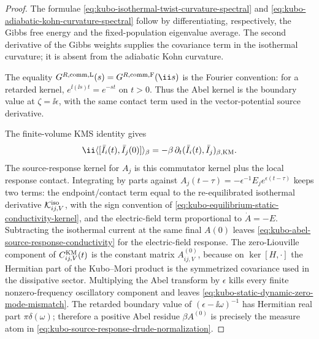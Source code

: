 \begin{proof}
The formulae
\eqref{eq:kubo-isothermal-twist-curvature-spectral} and
\eqref{eq:kubo-adiabatic-kohn-curvature-spectral} follow by differentiating,
respectively, the Gibbs free energy and the fixed-population eigenvalue
average.  The second derivative of the Gibbs weights supplies the covariance
term in the isothermal curvature; it is absent from the adiabatic Kohn
curvature.

The equality
\(G^{R,\rm comm,L}(s)=G^{R,\rm comm,F}(\ii s)\) is the Fourier convention:
for a retarded kernel,
\(e^{\ii(\ii s)t}=e^{-st}\) on \(t>0\).  Thus the Abel kernel is the boundary
value at \(\zeta=\ii\epsilon\), with the same contact term used in the
vector-potential source derivative.

The finite-volume KMS identity gives
\[
  \ii\langle[\bar I_i(t),\bar I_j(0)]\rangle_\beta
  =
  -\beta\,\partial_t
  (\bar I_i(t),\bar I_j)_{\beta,{\rm KM}} .
\]
The source-response kernel for \(A_j\) is this commutator kernel plus the local
response contact.  Integrating by parts against
\(A_j(t-\tau)=-\epsilon^{-1}E_j e^{\epsilon(t-\tau)}\) keeps two terms: the
endpoint/contact term equal to the re-equilibrated isothermal derivative
\(\mathcal K^{\rm iso}_{ij,V}\), with the sign convention of
\eqref{eq:kubo-equilibrium-static-conductivity-kernel}, and the electric-field
term proportional to \(\dot A=-E\).  Subtracting the isothermal current at the
same final \(A(0)\) leaves
\eqref{eq:kubo-abel-source-response-conductivity} for the electric-field
response.  The zero-Liouville component of \(C^{\rm KM}_{ij,V}(t)\) is the
constant matrix \(A^{(0)}_{ij,V}\), because on \(\ker[H,\cdot]\) the
Hermitian part of the Kubo--Mori product is the symmetrized covariance used
in the dissipative sector.  Multiplying the Abel transform by \(\epsilon\)
kills every finite nonzero-frequency oscillatory component and leaves
\eqref{eq:kubo-static-dynamic-zero-mode-mismatch}.  The retarded boundary
value of \((\epsilon-\ii\omega)^{-1}\) has Hermitian real part
\(\pi\delta(\omega)\); therefore a positive Abel residue \(\beta A^{(0)}\) is
precisely the measure atom in
\eqref{eq:kubo-source-response-drude-normalization}.
\end{proof}

